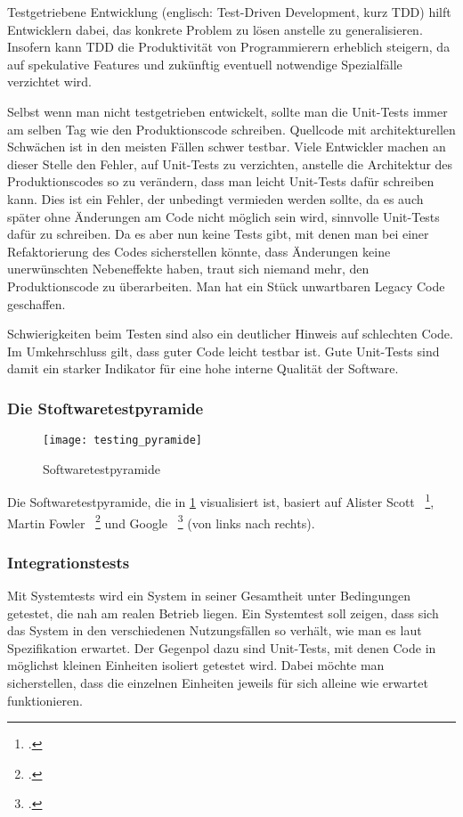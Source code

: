 Testgetriebene Entwicklung (englisch: Test-Driven Development, kurz TDD) hilft Entwicklern
dabei, das konkrete Problem zu lösen anstelle zu generalisieren. Insofern kann TDD
die Produktivität von Programmierern erheblich steigern, da auf spekulative Features und
zukünftig eventuell notwendige Spezialfälle verzichtet wird.

Selbst wenn man nicht testgetrieben entwickelt, sollte man die Unit-Tests immer am selben
Tag wie den Produktionscode schreiben. Quellcode mit architekturellen Schwächen ist in den 
meisten Fällen schwer testbar. Viele Entwickler machen an dieser Stelle den Fehler, auf Unit-Tests
zu verzichten, anstelle die Architektur des Produktionscodes so zu verändern, dass man
leicht Unit-Tests dafür schreiben kann. Dies ist ein Fehler, der unbedingt vermieden werden
sollte, da es auch später ohne Änderungen am Code nicht möglich sein wird, sinnvolle Unit-Tests
dafür zu schreiben. Da es aber nun keine Tests gibt, mit denen man bei einer Refaktorierung
des Codes sicherstellen könnte, dass Änderungen keine unerwünschten Nebeneffekte haben, traut sich niemand mehr,
den Produktionscode zu überarbeiten. Man hat ein Stück unwartbaren Legacy Code geschaffen.

Schwierigkeiten beim Testen sind also ein deutlicher Hinweis auf schlechten Code. Im Umkehrschluss
gilt, dass guter Code leicht testbar ist. Gute Unit-Tests sind damit ein starker Indikator für eine hohe interne Qualität der Software.

\subsubsection{Die Stoftwaretestpyramide}

\begin{figure}[H]
	\begin{center}
		\texttt{[image: testing\_pyramide]}
		\caption{Softwaretestpyramide}
		\label{[softwaretestpyramide]}
	\end{center}
\end{figure}

Die Softwaretestpyramide, die in \ref{[softwaretestpyramide]} visualisiert ist, basiert auf Alister Scott ~\footcite[Vgl.]{website:scott.2011}, Martin Fowler
 ~\footcite[Vgl.]{website:fowler.2012} und Google  ~\footcite[Vgl. Seite 12-14]{Whittaker.2012} (von links nach rechts).


\subsubsection{Integrationstests}
Mit Systemtests wird ein System in seiner Gesamtheit unter Bedingungen getestet, die nah
am realen Betrieb liegen. Ein Systemtest soll zeigen, dass sich das System in den verschiedenen
Nutzungsfällen so verhält, wie man es laut Spezifikation erwartet. Der Gegenpol dazu sind
Unit-Tests, mit denen Code in möglichst kleinen Einheiten isoliert getestet wird. Dabei möchte
man sicherstellen, dass die einzelnen Einheiten jeweils für sich alleine wie erwartet funktionieren.

